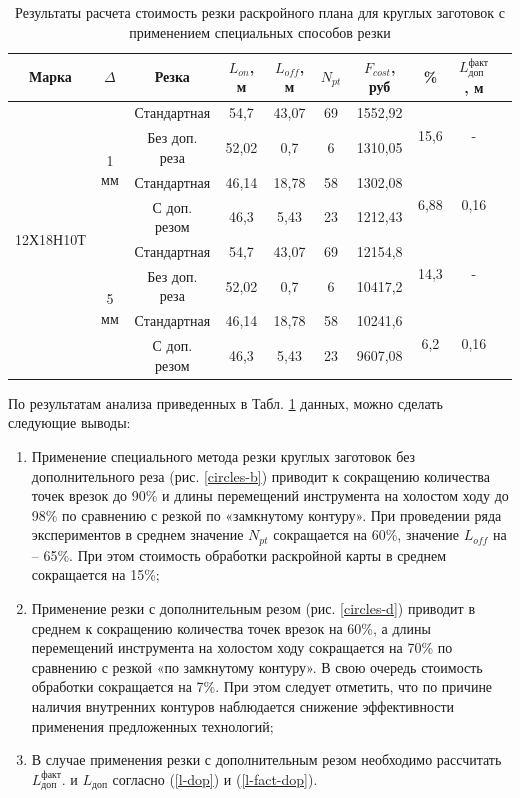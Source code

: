 \documentclass[12pt]{report}
\begin{document}
\begin{table}
  \caption{Результаты расчета стоимость резки раскройного плана для круглых заготовок с применением специальных способов резки}
  \label{circles}
  \begin{tabular}{cccccccccc}
    \hline
    Марка & $\Delta$ & Резка & $L_{on}$, м & $L_{off}$, м & $N_{pt}$ & $F_{cost}$, руб & \% & $L_\text{доп}^\text{факт}$, м \\
    \hline
    \multirow{8}{*}{12Х18Н10Т} & \multirow{4}{*}{1 мм} & Стандартная & 54,7 &	43,07	& 69 & 1552,92 & \multirow{2}{*}{15,6} &	\multirow{2}{*}{-} \\
    & & Без доп. реза & 52,02 &	0,7 & 6 & 1310,05 \\
    & & Стандартная   & 46,14 & 18,78 & 58 & 1302,08 & \multirow{2}{*}{6,88} & \multirow{2}{*}{0,16} \\
    & & С доп. резом  & 46,3  & 5,43  & 23 & 1212,43 \\
    & \multirow{4}{*}{5 мм} & Стандартная & 54,7 &	43,07	& 69 & 12154,8 & \multirow{2}{*}{14,3} &	\multirow{2}{*}{-} \\
    & & Без доп. реза & 52,02 &	0,7 & 6 & 10417,2 \\
    & & Стандартная   & 46,14 & 18,78 & 58 & 10241,6 & \multirow{2}{*}{6,2} & \multirow{2}{*}{0,16} \\
    & & С доп. резом  & 46,3  & 5,43  & 23 & 9607,08 \\
  \end{tabular}
\end{table}

По результатам анализа приведенных в Табл. \ref{circles}
данных, можно сделать следующие выводы:

\begin{enumerate}
\item Применение специального метода резки круглых заготовок
без дополнительного реза (рис. \ref{circles-b})
приводит к сокращению количества точек врезок до 90\%
 и длины перемещений инструмента на холостом ходу до 98\%
 по сравнению с резкой по «замкнутому контуру».
 При проведении ряда экспериментов в среднем значение $N_{pt}$
 сокращается на 60\%, значение $L_{off}$ на – 65\%.
 При этом стоимость обработки раскройной карты в среднем сокращается на 15\%;

\item Применение резки с дополнительным резом (рис. \ref{circles-d})
приводит в среднем к сокращению количества точек врезок на 60\%,
а длины перемещений инструмента на холостом ходу сокращается на 70\%
по сравнению с резкой «по замкнутому контуру».
В свою очередь стоимость обработки сокращается на 7\%.
При этом следует отметить,
что по причине наличия внутренних контуров
наблюдается снижение эффективности применения
предложенных технологий;

\item В случае применения резки с дополнительным резом необходимо рассчитать
$L_\text{доп}^\text{факт}$.
и
$L_\text{доп}$
согласно (\ref{l-dop}) и (\ref{l-fact-dop}).
\end{enumerate}
\end{document}
